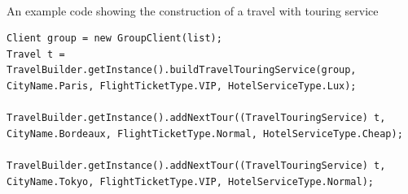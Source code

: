 \paragraph{}
An example code showing the construction of a travel with touring service

\begin{lstlisting}
Client group = new GroupClient(list);
Travel t = TravelBuilder.getInstance().buildTravelTouringService(group, CityName.Paris, FlightTicketType.VIP, HotelServiceType.Lux);

TravelBuilder.getInstance().addNextTour((TravelTouringService) t, CityName.Bordeaux, FlightTicketType.Normal, HotelServiceType.Cheap);

TravelBuilder.getInstance().addNextTour((TravelTouringService) t, CityName.Tokyo, FlightTicketType.VIP, HotelServiceType.Normal);
\end{lstlisting}


